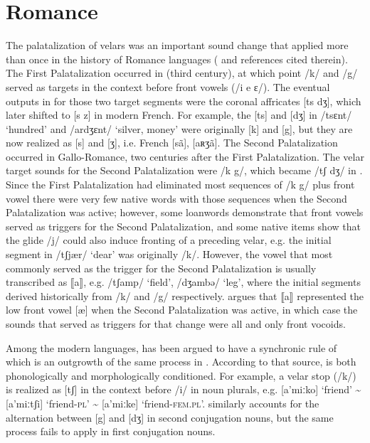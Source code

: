 \section{Romance} The palatalization of velars was an important sound change that applied more than once in the history of Romance languages (\citealt{Buckley2009} and references cited therein). The First Palatalization occurred in  (third century), at which point /k/ and /g/ served as targets in the context before front vowels (/i e ɛ/). The eventual outputs in  for those two target segments were the coronal affricates [ts dʒ], which later shifted to [s z] in modern French. For example, the [ts] and [dʒ] in  /tsɛnt/ ‘hundred’ and /ardʒɛnt/ ‘silver, money’ were originally [k] and [g], but they are now realized as [s] and [ʒ], i.e. French [sã], [aʀʒã]. The Second Palatalization occurred in Gallo-Romance, two centuries after the First Palatalization. The velar target sounds for the Second Palatalization were /k g/, which became /tʃ dʒ/ in . Since the First Palatalization had eliminated most sequences of /k g/ plus front vowel there were very few native words with those sequences when  the Second Palatalization was active; however, some loanwords demonstrate that front vowels served as triggers for the Second Palatalization, and some native items show that the glide /j/ could also induce fronting of a preceding velar, e.g. the initial segment in  /tʃjær/ ‘dear’ was originally /k/. However, the vowel that most commonly served as the trigger for the Second Palatalization is usually transcribed as ⟦a⟧, e.g.  /tʃamp/ ‘field’, /dʒambə/ ‘leg’, where the initial segments derived historically from /k/ and /g/ respectively. \citet{Buckley2009} argues that ⟦a⟧ represented the low front vowel [æ] when the  Second Palatalization was active, in which case the sounds that served as triggers for that change were all and only front vocoids.

Among the modern  languages,  has been argued to have a synchronic rule of  which is an outgrowth of the same process in  \citep{Krämer2009}. According to that source,  is both phonologically and morphologically conditioned. For example, a velar stop (/k/) is realized as [tʃ] in the context before /i/ in noun plurals, e.g. [a'miːko] ‘friend’ {\textasciitilde} [a'miːtʃi] ‘friend-\textsc{pl}’ {\textasciitilde} [a'miːke] ‘friend-\textsc{fem}.\textsc{pl}’.  similarly accounts for the alternation between [g] and [dʒ] in second conjugation nouns, but the same process fails to apply in first conjugation nouns.

